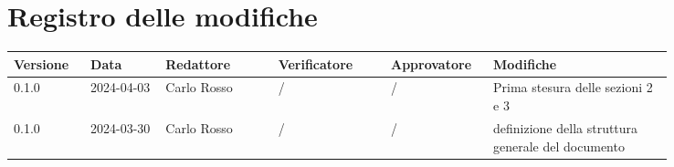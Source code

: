 \section*{Registro delle modifiche}
 {
  \renewcommand{\arraystretch}{1.5}
  \scriptsize
  \begin{longtable}{p{0.10\linewidth}p{0.10\linewidth}p{0.15\linewidth}p{0.15\linewidth}p{0.10\linewidth}p{0.24\linewidth}}
	  \textbf{Versione} & \textbf{Data} & \textbf{Redattore} & \textbf{Verificatore} & \textbf{Approvatore} & \textbf{Modifiche}                                 \\
	  \toprule
	  0.1.0             & 2024-04-03    & Carlo Rosso        & /                     & /                    & Prima stesura delle sezioni 2 e 3                  \\
	  \hline
	  0.1.0             & 2024-03-30    & Carlo Rosso        & /                     & /                    & definizione della struttura generale del documento \\
	  \bottomrule
  \end{longtable}
 }
